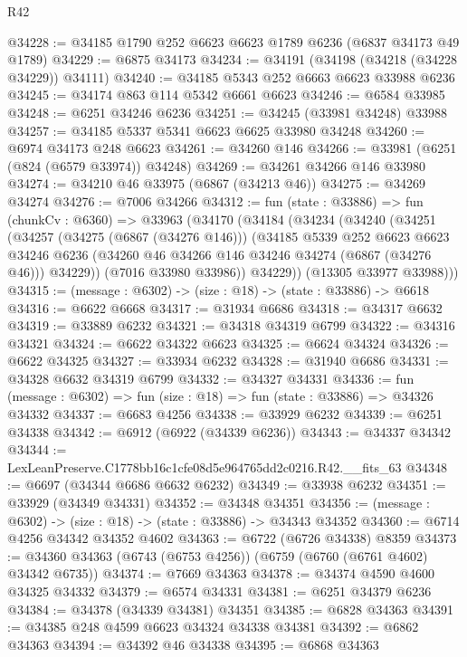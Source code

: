 \begin{lexlean}{R42}
\begin{coremodule}
{@34228 := @34185 @1790 @252 @6623 @6623 @1789 @6236 (@6837 @34173 @49 @1789)
@34229 := @6875 @34173
@34234 := @34191 (@34198 (@34218 (@34228 @34229)) @34111)
@34240 := @34185 @5343 @252 @6663 @6623 @33988 @6236
@34245 := @34174 @863 @114 @5342 @6661 @6623
@34246 := @6584 @33985
@34248 := @6251 @34246 @6236
@34251 := @34245 (@33981 @34248) @33988
@34257 := @34185 @5337 @5341 @6623 @6625 @33980 @34248
@34260 := @6974 @34173 @248 @6623
@34261 := @34260 @146
@34266 := @33981 (@6251 (@824 (@6579 @33974)) @34248)
@34269 := @34261 @34266 @146 @33980
@34274 := @34210 @46 @33975 (@6867 (@34213 @46))
@34275 := @34269 @34274
@34276 := @7006 @34266
@34312 := fun (state : @33886) =>
  fun (chunkCv : @6360) =>
  @33963
    (@34170
      (@34184
        (@34234
          (@34240
            (@34251
              (@34257
                (@34275 (@6867 (@34276 @146)))
                (@34185
                  @5339
                  @252
                  @6623
                  @6623
                  @34246
                  @6236
                  (@34260 @46 @34266 @146 @34246 @34274 (@6867 (@34276 @46)))
                  @34229))
              (@7016 @33980 @33986))
            @34229))
        (@13305 @33977 @33988)))
@34315 := (message : @6302) -> (size : @18) -> (state : @33886) -> @6618
@34316 := @6622 @6668
@34317 := @31934 @6686
@34318 := @34317 @6632
@34319 := @33889 @6232
@34321 := @34318 @34319 @6799
@34322 := @34316 @34321
@34324 := @6622 @34322 @6623
@34325 := @6624 @34324
@34326 := @6622 @34325
@34327 := @33934 @6232
@34328 := @31940 @6686
@34331 := @34328 @6632 @34319 @6799
@34332 := @34327 @34331
@34336 := fun (message : @6302) => fun (size : @18) => fun (state : @33886) => @34326 @34332
@34337 := @6683 @4256
@34338 := @33929 @6232
@34339 := @6251 @34338
@34342 := @6912 (@6922 (@34339 @6236))
@34343 := @34337 @34342
@34344 := LexLeanPreserve.C1778bb16c1cfe08d5e964765dd2c0216.R42.__fits_63
@34348 := @6697 (@34344 @6686 @6632 @6232)
@34349 := @33938 @6232
@34351 := @33929 (@34349 @34331)
@34352 := @34348 @34351
@34356 := (message : @6302) -> (size : @18) -> (state : @33886) -> @34343 @34352
@34360 := @6714 @4256 @34342 @34352 @4602
@34363 := @6722 (@6726 @34338) @8359
@34373 := @34360 @34363 (@6743 (@6753 @4256)) (@6759 (@6760 (@6761 @4602) @34342 @6735))
@34374 := @7669 @34363
@34378 := @34374 @4590 @4600 @34325 @34332
@34379 := @6574 @34331
@34381 := @6251 @34379 @6236
@34384 := @34378 (@34339 @34381) @34351
@34385 := @6828 @34363
@34391 := @34385 @248 @4599 @6623 @34324 @34338 @34381
@34392 := @6862 @34363
@34394 := @34392 @46 @34338
@34395 := @6868 @34363
}
\end{coremodule}
\end{lexlean}
